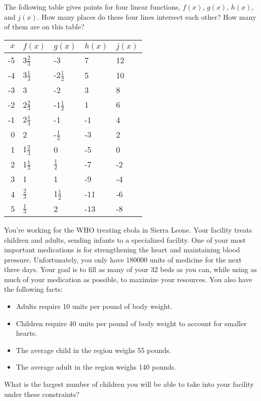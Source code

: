 \begin{exercise}
The following table gives points for four linear functions, $f(x)$, $g(x)$, $h(x)$, and $j(x)$.  How many places do these four lines intersect each other?  How many of them are on this table?

	\begin{tabular}{|r|l|l|l|l|}
	\hline
	$x$ & $f(x)$ & $g(x)$ & $h(x)$ & $j(x)$\\
	\hline
	-5 & 3$\frac{2}{3}$ & -3 & 7 & 12\\
	\hline
	-4 & 3$\frac{1}{3}$ & -2$\frac{1}{2}$ & 5 & 10 \\
	\hline
	-3 & 3 & -2 & 3 & 8\\
	\hline
	-2 & 2$\frac{2}{3}$ & -1$\frac{1}{2}$ & 1 & 6\\
	\hline
	-1 & 2$\frac{1}{3}$ & -1 & -1 & 4\\
	\hline
	0 & 2 & -$\frac{1}{2}$ & -3 & 2\\
	\hline
	1 & 1$\frac{2}{3}$ & 0 & -5 & 0\\
	\hline
	2 & 1$\frac{1}{3}$ & $\frac{1}{2}$ & -7 & -2\\
	\hline
	3 & 1 & 1 & -9 & -4\\
	\hline
	4 & $\frac{2}{3}$ & 1$\frac{1}{2}$ & -11 & -6\\
	\hline
	5 & $\frac{1}{3}$ & 2 & -13 & -8\\
	\hline
	\end{tabular}
\end{exercise}
\bigskip

\begin{exercise}

\end{exercise}
\bigskip

\begin{exercise}
You're working for the WHO treating ebola in Sierra Leone.  Your facility treats children and adults, sending infants to a specialized facility.  One of your most important medications is for strengthening the heart and maintaining blood pressure.  Unfortunately, you only have 180000 units of medicine for the next three days.  Your goal is to fill as many of your 32 beds as you can, while using as much of your medication as possible, to maximize your resources.  You also have the following facts:

\begin{itemize}
\item Adults require 10 units per pound of body weight.
\item Children require 40 units per pound of body weight to account for smaller hearts.
\item The average child in the region weighs 55 pounds.
\item The average adult in the region weighs 140 pounds.
\end{itemize}

What is the largest number of children you will be able to take into your facility under these constraints?

\end{exercise}
\bigskip

